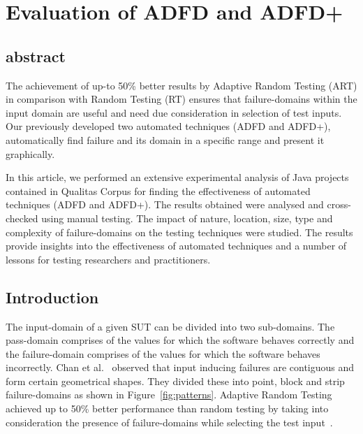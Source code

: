 
\chapter{Evaluation of ADFD and ADFD+}
\label{chap:futureWork}
	


\section{abstract}
The achievement of up-to 50\% better results by Adaptive Random Testing (ART) in comparison with Random Testing (RT) ensures that failure-domains within the input domain are useful and need due consideration in selection of test inputs. Our previously developed two automated techniques (ADFD and ADFD+), automatically find failure and its domain in a specific range and present it graphically.

In this article, we performed an extensive experimental analysis of Java projects contained in Qualitas Corpus for finding the effectiveness of automated techniques (ADFD and ADFD+). The results obtained were analysed and cross-checked using manual testing. The impact of nature, location, size, type and complexity of failure-domains on the testing techniques were studied. The results provide insights into the effectiveness of automated techniques and a number of lessons for testing researchers and practitioners.






\section{Introduction}
The input-domain of a given SUT can be divided into two sub-domains. The pass-domain comprises of the values for which the software behaves correctly and the failure-domain comprises of the values for which the software behaves incorrectly. Chan et al.~\cite{chan1996proportional} observed that input inducing failures are contiguous and form certain geometrical shapes. They divided these into point, block and strip failure-domains as shown in Figure~\ref{fig:patterns}. Adaptive Random Testing achieved up to 50\% better performance than random testing by taking into consideration the presence of failure-domains while selecting the test input~\cite{chen2005adaptive}.

